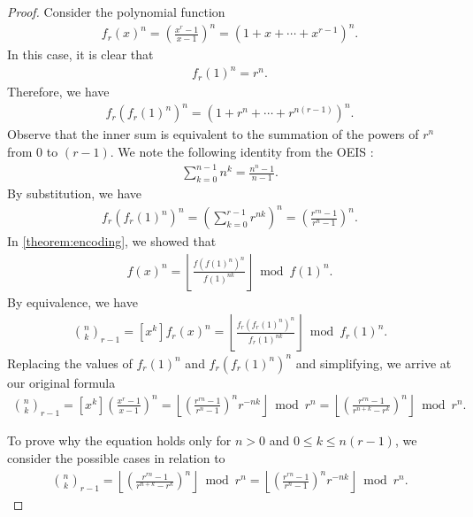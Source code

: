 \documentclass{article}
\theoremstyle{plain}
\theoremstyle{definition}
\begin{document}
\begin{proof}
Consider the polynomial function
\begin{align*}
    f_r(x)^n = \left(\frac{x^{r}-1}{x-1}\right)^n = (1 + x + \cdots + x^{r-1})^n .
\end{align*}
In this case, it is clear that
\begin{align*}
    f_r(1)^n = r^n .
\end{align*}
Therefore, we have
\begin{align*}
    f_r(f_r(1)^n)^n = (1 + r^n + \cdots + r^{n (r - 1)})^n .
\end{align*}
Observe that the inner sum is equivalent to the summation of the powers of $r^n$ from $0$ to $(r - 1)$. We note the following identity from the OEIS \cite{A023037}:
\begin{align*}
    \sum_{k=0}^{n-1} n^k = \frac{n^{n} - 1}{n - 1} .
\end{align*}
By substitution, we have
\begin{align*}
    f_r(f_r(1)^n)^n = \left(\sum_{k=0}^{r-1} r^{nk}\right)^n = \left(\frac{r^{rn} - 1}{r^{n} - 1}\right)^n .
\end{align*}
In \cref{theorem:encoding}, we showed that
\begin{align*}
    [x^k] f(x)^{n} = \left\lfloor\frac{f(f(1)^n)^{n}}{f(1)^{n k}}\right\rfloor \bmod{f(1)^{n}} .
\end{align*}
By equivalence, we have
\begin{align*}
    \binom{n}{k}_{r-1} = [x^k] f_r(x)^{n} = \left\lfloor\frac{f_r(f_r(1)^n)^{n}}{f_r(1)^{n k}}\right\rfloor \bmod{f_r(1)^{n}} .
\end{align*}
Replacing the values of $f_r(1)^n$ and $f_r(f_r(1)^n)^n$ and simplifying, we arrive at our original formula
\begin{align*}
    \binom{n}{k}_{r-1} = [x^k] \left(\frac{x^{r}-1}{x-1}\right)^n
    = \left\lfloor \left(\frac{r^{rn} - 1}{r^{n} - 1}\right)^n r^{-n k}\right\rfloor \bmod r^n
    = \left\lfloor \left(\frac{r^{rn} - 1}{r^{n+k} - r^k}\right)^n\right\rfloor \bmod r^n .
\end{align*}

To prove why the equation holds only for $n > 0$ and $0 \leq k \leq n (r-1)$, we consider the possible cases in relation to
\begin{align*}
    \binom{n}{k}_{r-1} = \left\lfloor \left(\frac{r^{rn} - 1}{r^{n+k} - r^k}\right)^n\right\rfloor \bmod r^n
    = \left\lfloor \left(\frac{r^{rn} - 1}{r^{n} - 1}\right)^n r^{-n k}\right\rfloor \bmod r^n .
\end{align*}


\end{proof}
\end{document}
